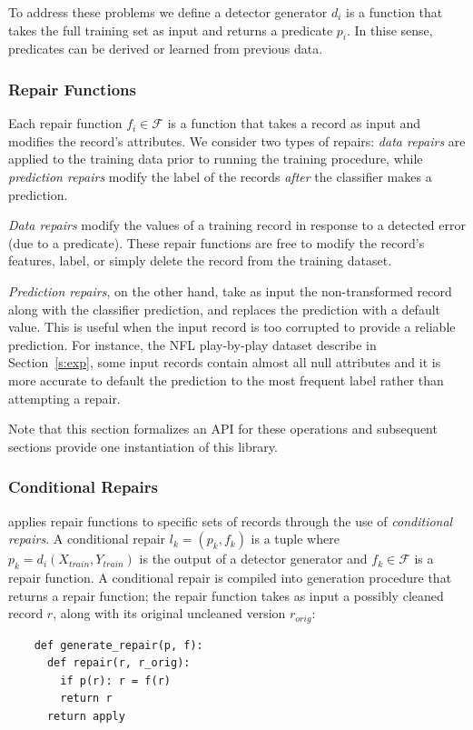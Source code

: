 To address these problems we define a detector generator $d_i$ is a function that takes the full training set as input and returns a predicate $p_i$. 
In thise sense, predicates can be derived or learned from previous data.

\subsubsection{Repair Functions}
Each repair function $f_i \in \mathcal{F}$ is a function that takes a record as input and modifies the record's attributes.  We consider two types of repairs:  {\it data repairs} are applied to the training data prior to running the training procedure, while {\it prediction repairs} modify the label of the records {\it after} the classifier makes a prediction.   

{\it Data repairs} modify the values of a training record in response to a detected error (due to a predicate).  These repair functions are free to modify the record's features, label, or simply delete the record from the training dataset.  

{\it Prediction repairs}, on the other hand, take as input the non-transformed record along with the classifier prediction, and replaces the prediction with a default value.  This is useful when the input record is too corrupted to provide a reliable prediction.  For instance, the NFL play-by-play dataset describe in Section~\ref{s:exp}, some input records contain almost all null attributes and it is more accurate to default the prediction to the most frequent label rather than attempting a repair.

Note that this section formalizes an API for these operations and subsequent sections provide one instantiation of this library.

\subsubsection{Conditional Repairs}
\sys applies repair functions to specific sets of records through the use of {\it conditional repairs}.  A conditional repair $l_k = (p_k, f_k)$ is a tuple where $p_k = d_i(X_{train}, Y_{train})$ is the output of a detector generator and $f_k \in \mathcal{F}$ is a repair function. 
A conditional repair is compiled into generation procedure that returns a repair function; the repair function takes as input a possibly cleaned record $r$, along with its original uncleaned version $r_{orig}$:
{\small\begin{verbatim}
    def generate_repair(p, f):
      def repair(r, r_orig):
        if p(r): r = f(r)   
        return r 
      return apply
\end{verbatim}}

